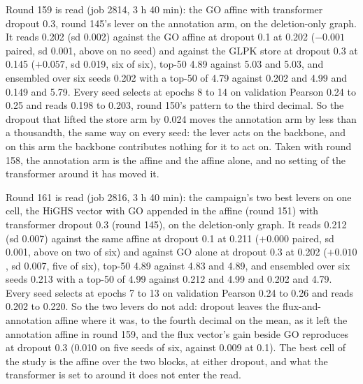 Round 159 is read (job 2814, 3 h 40 min): the GO affine with transformer dropout 0.3,
round 145's lever on the annotation arm, on the deletion-only graph. It reads 0.202 (sd
0.002) against the GO affine at dropout 0.1 at 0.202 ($-0.001$ paired, sd 0.001, above
on no seed) and against the GLPK store at dropout 0.3 at 0.145 ($+0.057$, sd 0.019, six
of six), top-50 4.89 against 5.03 and 5.03, and ensembled over six seeds 0.202 with a
top-50 of 4.79 against 0.202 and 4.99 and 0.149 and 5.79. Every seed selects at epochs
8 to 14 on validation Pearson 0.24 to 0.25 and reads 0.198 to 0.203, round 150's
pattern to the third decimal. So the dropout that lifted the store arm by 0.024 moves
the annotation arm by less than a thousandth, the same way on every seed: the lever
acts on the backbone, and on this arm the backbone contributes nothing for it to act
on. Taken with round 158, the annotation arm is the affine and the affine alone, and no
setting of the transformer around it has moved it.

Round 161 is read (job 2816, 3 h 40 min): the campaign's two best levers on one cell,
the HiGHS vector with GO appended in the affine (round 151) with transformer dropout
0.3 (round 145), on the deletion-only graph. It reads 0.212 (sd 0.007) against the
same affine at dropout 0.1 at 0.211 ($+0.000$ paired, sd 0.001, above on two of six)
and against GO alone at dropout 0.3 at 0.202 ($+0.010$, sd 0.007, five of six), top-50
4.89 against 4.83 and 4.89, and ensembled over six seeds 0.213 with a top-50 of 4.99
against 0.212 and 4.99 and 0.202 and 4.79. Every seed selects at epochs 7 to 13 on
validation Pearson 0.24 to 0.26 and reads 0.202 to 0.220. So the two levers do not
add: dropout leaves the flux-and-annotation affine where it was, to the fourth decimal
on the mean, as it left the annotation affine in round 159, and the flux vector's gain
beside GO reproduces at dropout 0.3 (0.010 on five seeds of six, against 0.009 at
0.1). The best cell of the study is the affine over the two blocks, at either dropout,
and what the transformer is set to around it does not enter the read.

